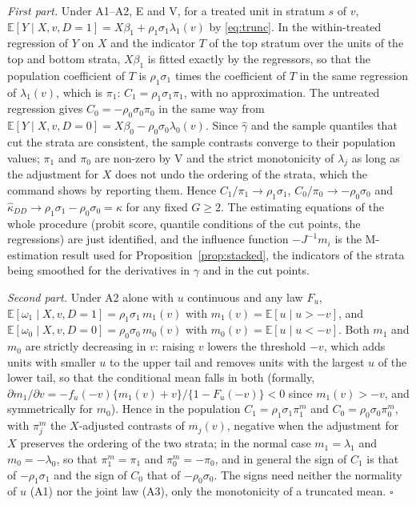 \documentclass[11pt,a4paper]{article}
\theoremstyle{plain}
\theoremstyle{definition}
\theoremstyle{remark}
\newcommand{\E}{\mathbb{E}}
\newcommand{\1}{\mathbf{1}}
\begin{document}
\emph{First part.} Under A1--A2, E and V, for a treated unit in stratum
$s$ of $v$, $\E[Y\mid X,v,D=1]=X\beta_1+\rho_1\sigma_1\lambda_1(v)$ by
\eqref{eq:trunc}. In the within-treated regression of $Y$ on $X$ and the
indicator $T$ of the top stratum over the units of the top and bottom
strata, $X\beta_1$ is fitted exactly by the regressors, so that the
population coefficient of $T$ is $\rho_1\sigma_1$ times the coefficient
of $T$ in the same regression of $\lambda_1(v)$, which is $\pi_1$:
$C_1=\rho_1\sigma_1\pi_1$, with no approximation. The untreated regression
gives $C_0=-\rho_0\sigma_0\pi_0$ in the same way from
$\E[Y\mid X,v,D=0]=X\beta_0-\rho_0\sigma_0\lambda_0(v)$. Since $\hat\gamma$
and the sample quantiles that cut the strata are consistent, the sample
contrasts converge to their population values; $\pi_1$ and $\pi_0$ are
non-zero by V and the strict monotonicity of $\lambda_j$ as long as the
adjustment for $X$ does not undo the ordering of the strata, which the
command shows by reporting them. Hence $C_1/\pi_1\to\rho_1\sigma_1$,
$C_0/\pi_0\to-\rho_0\sigma_0$ and
$\hat\kappa_{DD}\to\rho_1\sigma_1-\rho_0\sigma_0=\kappa$ for any fixed
$G\ge2$. The estimating equations of the whole procedure (probit score,
quantile conditions of the cut points, the regressions) are just
identified, and the influence function $-J^{-1}m_i$ is the M-estimation
result used for Proposition~\ref{prop:stacked}, the indicators of the
strata being smoothed for the derivatives in $\gamma$ and in the cut
points.

\emph{Second part.} Under A2 alone with $u$ continuous and any law $F_u$,
$\E[\omega_1\mid X,v,D=1]=\rho_1\sigma_1\,m_1(v)$ with
$m_1(v)=\E[u\mid u>-v]$, and $\E[\omega_0\mid X,v,D=0]=\rho_0\sigma_0\,m_0(v)$
with $m_0(v)=\E[u\mid u<-v]$. Both $m_1$ and $m_0$ are strictly decreasing
in $v$: raising $v$ lowers the threshold $-v$, which adds units with
smaller $u$ to the upper tail and removes units with the largest $u$ of
the lower tail, so that the conditional mean falls in both (formally,
$\partial m_1/\partial v=-f_u(-v)\{m_1(v)+v\}/\{1-F_u(-v)\}<0$ since
$m_1(v)>-v$, and symmetrically for $m_0$). Hence in the population
$C_1=\rho_1\sigma_1\pi^m_1$ and $C_0=\rho_0\sigma_0\pi^m_0$, with $\pi^m_j$
the $X$-adjusted contrasts of $m_j(v)$, negative when the adjustment for
$X$ preserves the ordering of the two strata; in the normal case
$m_1=\lambda_1$ and $m_0=-\lambda_0$, so that $\pi^m_1=\pi_1$ and
$\pi^m_0=-\pi_0$, and in general the sign of $C_1$ is that of
$-\rho_1\sigma_1$ and the sign of $C_0$ that of $-\rho_0\sigma_0$. The
signs need neither the normality of $u$ (A1) nor the joint law (A3), only
the monotonicity of a truncated mean. \hfill$\square$
\end{document}
